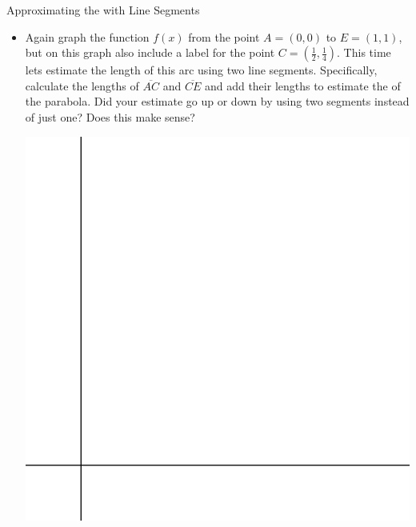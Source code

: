 \begin{exercise}{Approximating the  with Line Segments \Coffeecup \Coffeecup }
\begin{itemize}
\item Again graph the function $f(x)$ from the point $A=(0,0)$ to $E=(1,1)$, but on this graph also include a label for the point $C=(\frac{1}{2},\frac{1}{4})$.  This time lets estimate the length of this arc using two line segments.  Specifically, calculate the lengths of $\overline{AC}$ and $\overline{CE}$ and add their lengths to estimate the  of the parabola.  Did your estimate go up or down by using two segments instead of just one?  Does this make sense?

\includegraphics[scale=0.5]{quad1.eps}
\end{itemize}
\end{exercise}

